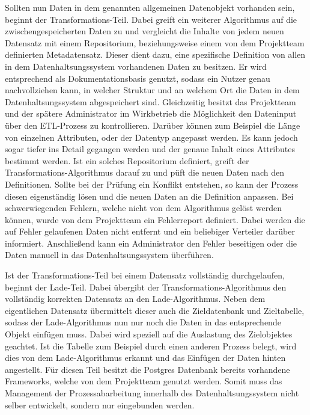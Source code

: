 Sollten nun Daten in dem genannten allgemeinen Datenobjekt vorhanden sein,
beginnt der Transformations-Teil. Dabei greift ein weiterer Algorithmus auf
die zwischengespeicherten Daten zu und vergleicht die Inhalte von jedem neuen
Datensatz mit einem \gls{Repositorium}, beziehungsweise einem von dem
Projektteam definierten Metadatensatz. Dieser dient dazu, eine spezifische
Definition von allen in dem Datenhaltsungssystem vorhandenen Daten zu besitzen.
Er wird entsprechend als Dokumentationsbasis genutzt, sodass ein Nutzer genau
nachvollziehen kann, in welcher Struktur und an welchem Ort die Daten in dem
Datenhaltsungssystem abgespeichert sind. Gleichzeitig besitzt das Projektteam
und der spätere Administrator im Wirkbetrieb die Möglichkeit den Dateninput
über den ETL-Prozess zu kontrollieren. Darüber können zum Beispiel die Länge
von einzelnen Attributen, oder der Datentyp angepasst werden. Es kann jedoch
sogar tiefer ins Detail gegangen werden und der genaue Inhalt eines Attributes
bestimmt werden. Ist ein solches \gls{Repositorium} definiert, greift der
Transformations-Algorithmus darauf zu und püft die neuen Daten nach den
Definitionen. Sollte bei der Prüfung ein Konflikt entstehen, so kann der
Prozess diesen eigenständig lösen und die neuen Daten an die Definition
anpassen. Bei schwerwiegenden Fehlern, welche nicht von dem Algorithmus
gelöst werden können, wurde von dem Projektteam ein Fehlerreport definiert.
Dabei werden die auf Fehler gelaufenen Daten nicht entfernt und ein
beliebiger Verteiler darüber informiert. Anschließend kann ein Administrator
den Fehler beseitigen oder die Daten manuell in das Datenhaltsungssystem
überführen.

Ist der Transformations-Teil bei einem Datensatz vollständig durchgelaufen,
beginnt der Lade-Teil. Dabei übergibt der Transformations-Algorithmus den
vollständig korrekten Datensatz an den Lade-Algorithmus. Neben dem eigentlichen
Datensatz übermittelt dieser auch die Zieldatenbank und Zieltabelle, sodass
der Lade-Algorithmus nun nur noch die Daten in das entsprechende Objekt
einfügen muss. Dabei wird speziell auf die Auslastung des Zielobjektes
geachtet. Ist die Tabelle zum Beispiel durch einen anderen Prozess belegt,
wird dies von dem Lade-Algorithmus erkannt und das Einfügen der Daten
hinten angestellt. Für diesen Teil besitzt die Postgres Datenbank bereits
vorhandene Frameworks, welche von dem Projektteam genutzt werden. Somit muss
das Management der Prozessabarbeitung innerhalb des Datenhaltsungssystem nicht
selber entwickelt, sondern nur eingebunden werden.
\nl%

